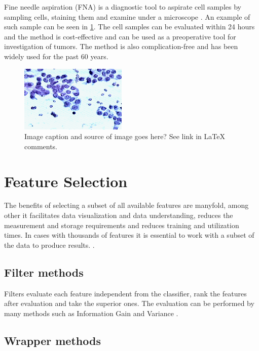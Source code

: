 \documentclass{kththesis}
\begin{document}
Fine needle aspiration (FNA) is a diagnostic tool to aspirate cell samples by sampling cells, staining them and examine under a microscope \parencite{FNA}. An example of such sample can be seen in \ref{fig:fna_nuclei}. The cell samples can be evaluated within 24 hours and the method is cost-effective and can be used as a preoperative tool for investigation of tumors. The method is also complication-free and has been widely used for the past 60 years.

\begin{figure}[ht!]
  \centering
  \includegraphics[]{images/fna_nuclei.png}
  \caption{Image caption and source of image goes here? See link in LaTeX comments.}
  \label{fig:fna_nuclei}
\end{figure}


\section{Feature Selection}

The benefits of selecting a subset of all available features are manyfold, among other it facilitates data visualization and data understanding, reduces the measurement and storage requirements and reduces training and utilization times. In cases with thousands of features it is essential to work with a subset of the data to produce results. \parencite{guyon2003}.

\subsection{Filter methods} %

Filters evaluate each feature independent from the classifier, rank the features after evaluation and take the superior ones. The evaluation can be performed by many methods such as Information Gain and Variance \parencite{guyon2003}.

\subsection{Wrapper methods} %
\end{document}
